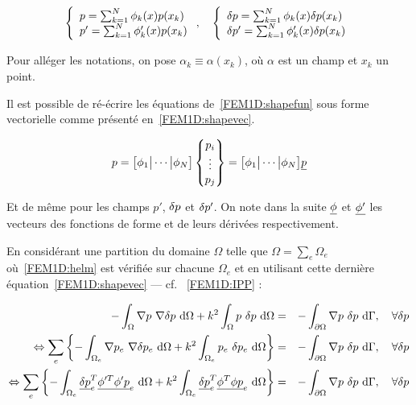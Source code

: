 \begin{equation}
	\left\{\begin{array}{l}
		p = \sum_{k=1}^N \phi_k(x)p(x_k)\\
		p' = \sum_{k=1}^N \phi_k'(x)p(x_k)\\
	\end{array}\right., \quad
	\left\{\begin{array}{l}
		\delta p = \sum_{k=1}^N \phi_k(x)\delta p(x_k)\\
		\delta p' = \sum_{k=1}^N \phi_k'(x)\delta p(x_k)\\
	\end{array}\right.\label{FEM1D:shapefun}
\end{equation}

Pour alléger les notations, on pose $\alpha_k\equiv \alpha(x_k)$, où $\alpha$ est un champ et $x_k$ un point.

Il est possible de ré-écrire les équations de~\eqref{FEM1D:shapefun} sous forme vectorielle comme présenté
en~\eqref{FEM1D:shapevec}.

\begin{equation}
        p = \big[\phi_1\big|\cdots\big|\phi_N\big]\begin{Bmatrix}p_i\\\vdots\\p_j\end{Bmatrix} =
			\big[\phi_1\big|\cdots\big|\phi_N\big]\underline{p}\label{FEM1D:shapevec}
\end{equation}

Et de même pour les champs $p'$, $\delta p$ et $\delta p'$. On note dans la suite $\underline{\phi}$ et $\underline{\phi'}$ les vecteurs des fonctions de
forme et de leurs dérivées respectivement.

En considérant une partition du domaine $\Omega$ telle que $\Omega = \sum_e\Omega_e$ où~\eqref{FEM1D:helm} est vérifiée
sur chacune $\Omega_e$ et en utilisant cette dernière équation~\eqref{FEM1D:shapevec} --- cf. ~\eqref{FEM1D:IPP} :

\begin{eqnarray*}
	- \int_\Omega \nabla p~\nabla \delta p ~\mathrm{d}\Omega + k^2\int_\Omega p~\delta p~\mathrm{d}\Omega & = & -\int_{\partial\Omega}\nabla p~\delta p~\mathrm{d}\Gamma, \quad \forall\delta p\\
\Leftrightarrow \sum_e\left\{- \int_{\Omega_e} \nabla p_e~\nabla \delta p_e ~\mathrm{d}\Omega + k^2\int_{\Omega_e} p_e~\delta p_e~\mathrm{d}\Omega \right\}& = & -\int_{\partial\Omega}\nabla p~\delta p~\mathrm{d}\Gamma, \quad \forall\delta p\\
	\Leftrightarrow \sum_e\left\{- \int_{\Omega_e} \underline{\delta p}_e^T\underline{\phi'^T\phi'}\underline{p}_e~\mathrm{d}\Omega + k^2\int_{\Omega_e} \underline{\delta p}_e^T\underline{\phi^T\phi}\underline{p}_e~\mathrm{d}\Omega \right\}& = & -\int_{\partial\Omega}\nabla p~\delta p~\mathrm{d}\Gamma, \quad \forall\delta p\\
\end{eqnarray*}


